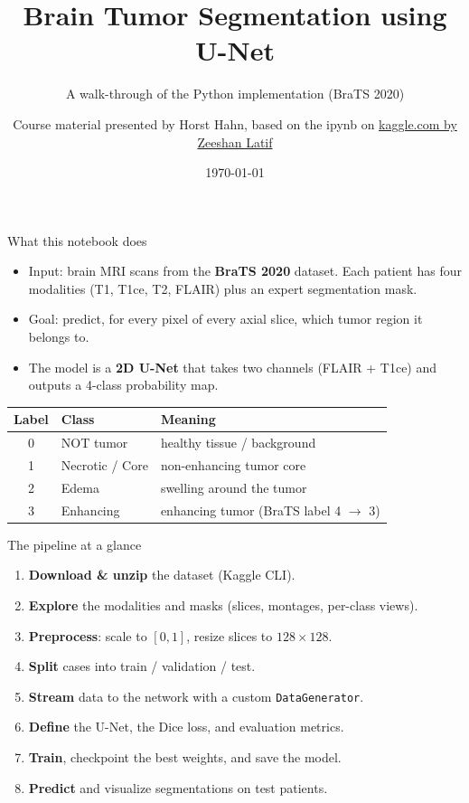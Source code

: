 \documentclass[10pt,aspectratio=169]{beamer}
\title{Brain Tumor Segmentation using U-Net}
\subtitle{A walk-through of the Python implementation (BraTS 2020)}
\author{Course material presented by Horst Hahn, based on the ipynb on \href{https://www.kaggle.com/code/zeeshanlatif/brain-tumor-segmentation-using-u-net}{kaggle.com by Zeeshan Latif}}
\date{\today}
\renewcommand{\section}[2][]{}
\begin{document}
\begin{frame}
  \titlepage
\end{frame}

\section{Overview}

\begin{frame}{What this notebook does}
  \begin{itemize}
    \item Input: brain MRI scans from the \textbf{BraTS 2020} dataset. Each patient
          has four modalities (T1, T1ce, T2, FLAIR) plus an expert segmentation mask.
    \item Goal: predict, for every pixel of every axial slice, which tumor region it belongs to.
    \item The model is a \textbf{2D U-Net} that takes two channels (FLAIR + T1ce) and outputs
          a 4-class probability map.
  \end{itemize}
  \vspace{0.4em}
  \begin{center}
  \begin{tabular}{cll}
    \textbf{Label} & \textbf{Class} & \textbf{Meaning}\\\hline
    0 & NOT tumor       & healthy tissue / background\\
    1 & Necrotic / Core & non-enhancing tumor core\\
    2 & Edema           & swelling around the tumor\\
    3 & Enhancing       & enhancing tumor (BraTS label 4 $\to$ 3)\\
  \end{tabular}
  \end{center}
\end{frame}

\begin{frame}{The pipeline at a glance}
  \begin{enumerate}
    \item \textbf{Download \& unzip} the dataset (Kaggle CLI).
    \item \textbf{Explore} the modalities and masks (slices, montages, per-class views).
    \item \textbf{Preprocess}: scale to $[0,1]$, resize slices to $128\times128$.
    \item \textbf{Split} cases into train / validation / test.
    \item \textbf{Stream} data to the network with a custom \texttt{DataGenerator}.
    \item \textbf{Define} the U-Net, the Dice loss, and evaluation metrics.
    \item \textbf{Train}, checkpoint the best weights, and save the model.
    \item \textbf{Predict} and visualize segmentations on test patients.
  \end{enumerate}
\end{frame}
\end{document}
